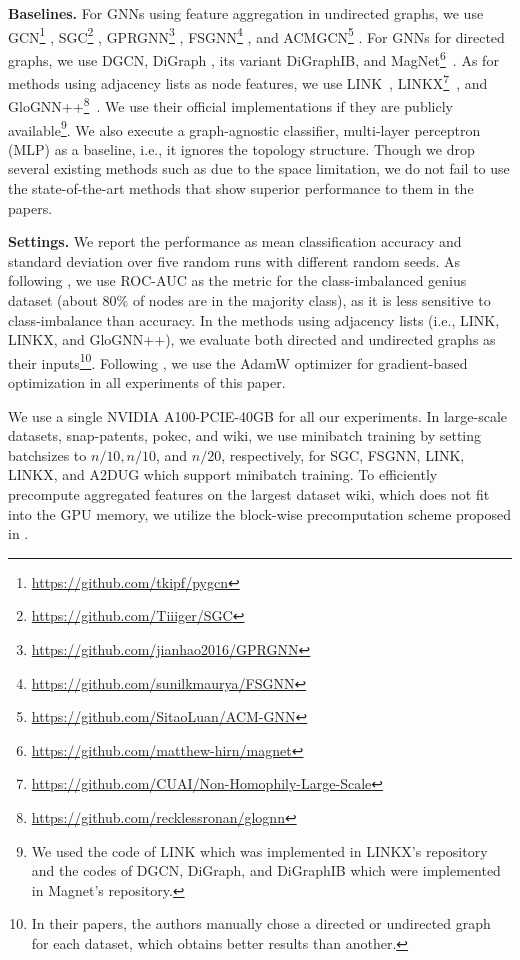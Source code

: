 \smallskip \noindent \textbf{Baselines. }
For GNNs using feature aggregation in undirected graphs, we use GCN\footnote{\url{https://github.com/tkipf/pygcn}} \cite{kipf2017semi}, SGC\footnote{\url{https://github.com/Tiiiger/SGC}} \cite{wu2019simplifying}, 
GPRGNN\footnote{\url{https://github.com/jianhao2016/GPRGNN}} \cite{chien2021adaptive}, FSGNN\footnote{\url{https://github.com/sunilkmaurya/FSGNN}} \cite{maurya2021improving},
and ACMGCN\footnote{\url{https://github.com/SitaoLuan/ACM-GNN}} \cite{luan2022revisiting}. 
For GNNs for directed graphs, we use DGCN\cite{tong2020directed}, DiGraph \cite{tong2020digraph}, its variant DiGraphIB, and MagNet\footnote{\url{https://github.com/matthew-hirn/magnet}}~\cite{zhang2021magnet}. 
As for methods using adjacency lists as node features, we use LINK~\cite{zheleva2009join}, LINKX\footnote{\url{https://github.com/CUAI/Non-Homophily-Large-Scale}}~\cite{lim2021large}, and GloGNN++\footnote{\url{https://github.com/recklessronan/glognn}}~\cite{li2022finding}. 
We use their official implementations if they are publicly available\footnote{We used the code of LINK which was implemented in LINKX's repository and the codes of DGCN, DiGraph, and DiGraphIB which were implemented in Magnet's repository.}.
We also execute a graph-agnostic classifier, multi-layer perceptron (MLP) as a baseline, i.e., it ignores the topology structure. 
Though we drop several existing methods such as \cite{velickovic2018graph, xu2018powerful, hamilton2017inductive, sign_icml_grl2020, zhu2020beyond} due to the space limitation, we do not fail to use the state-of-the-art methods that show superior performance to them in the papers. 

\smallskip \noindent \textbf{Settings.} 
We report the performance as mean classification accuracy and standard deviation over five random runs with different random seeds. 
As following \cite{lim2021large}, we use ROC-AUC as the metric for the class-imbalanced genius dataset (about $80\%$ of nodes are in the majority class), as it is less sensitive to class-imbalance than accuracy. 
In the methods using adjacency lists (i.e., LINK, LINKX, and GloGNN++), we evaluate both directed and undirected graphs as their inputs\footnote{In their papers, the authors manually chose a directed or undirected graph for each dataset, which obtains better results than another. }.
Following \cite{lim2021large}, we use the AdamW optimizer for gradient-based optimization in all experiments of this paper. 

We use a single NVIDIA A100-PCIE-40GB for all our experiments.
In large-scale datasets, snap-patents, pokec, and wiki, we use minibatch training by setting batchsizes to $n/10, n/10$, and $n/20$, respectively, for SGC, FSGNN, LINK, LINKX, and A2DUG which support minibatch training. 
To efficiently precompute aggregated features on the largest dataset wiki, which does not fit into the GPU memory, we utilize the block-wise
precomputation scheme proposed in \cite{maekawa2022gnn}.

